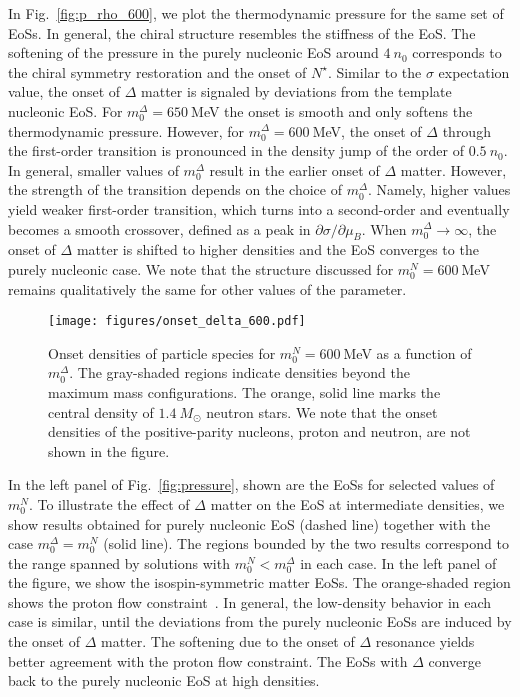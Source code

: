 \documentclass[preprint,showkeys,lengthcheck,nofootinbib,twocolumn,notitlepage,floatfix,superscriptaddress]{revtex4-1}
\begin{document}
In Fig.~\ref{fig:p_rho_600}, we plot the thermodynamic pressure for the same set of EoSs. In general, the chiral structure resembles the stiffness of the EoS. The softening of the pressure in the purely nucleonic EoS around $4~n_0$ corresponds to the chiral symmetry restoration and the onset of $N^\star$. Similar to the $\sigma$ expectation value, the onset of $\Delta$ matter is signaled by deviations from the template nucleonic EoS. For $m_0^\Delta=650~$MeV the onset is smooth and only softens the thermodynamic pressure. However, for $m_0^\Delta=600~$MeV, the onset of $\Delta$ through the first-order transition is pronounced in the density jump of the order of $0.5~n_0$. In general, smaller values of $m_0^\Delta$ result in the earlier onset of $\Delta$ matter. However, the strength of the transition depends on the choice of $m_0^\Delta$. Namely, higher values yield weaker first-order transition, which turns into a second-order and eventually becomes a smooth crossover, defined as a peak in $\partial \sigma / \partial \mu_B$. When $m_0^\Delta \rightarrow \infty$, the onset of $\Delta$ matter is shifted to higher densities and the EoS converges to the purely nucleonic case. We note that the structure discussed for $m_0^N=600~$MeV remains qualitatively the same for other values of the parameter.

\begin{figure}[t!]
  \centering
  \texttt{[image: figures/onset\_delta\_600.pdf]}
  \caption{Onset densities of particle species for $m_0^N=600~$MeV as a function of $m_0^\Delta$. The gray-shaded regions indicate densities beyond the maximum mass configurations. The orange, solid line marks the central density of $1.4~M_\odot$ neutron stars. We note that the onset densities of the positive-parity nucleons, proton and neutron, are not shown in the figure.}
  \label{fig:onset_delta}
\end{figure}

In the left panel of Fig.~\ref{fig:pressure}, shown are the EoSs for selected values of $m_0^N$. To illustrate the effect of $\Delta$ matter on the EoS at intermediate densities, we show results obtained for purely nucleonic EoS (dashed line) together with the case $m_0^\Delta = m_0^N$ (solid line). The regions bounded by the two results correspond to the range spanned by solutions with $m_0^N < m_0^\Delta$ in each case. In the left panel of the figure, we show the isospin-symmetric matter EoSs. The orange-shaded region shows the proton flow constraint~\cite{Danielewicz:2002pu}. In general, the low-density behavior in each case is similar, until the deviations from the purely nucleonic EoSs are induced by the onset of $\Delta$ matter. The softening due to the onset of $\Delta$ resonance yields better agreement with the proton flow constraint. The EoSs with $\Delta$ converge back to the purely nucleonic EoS at high densities. 
\end{document}
